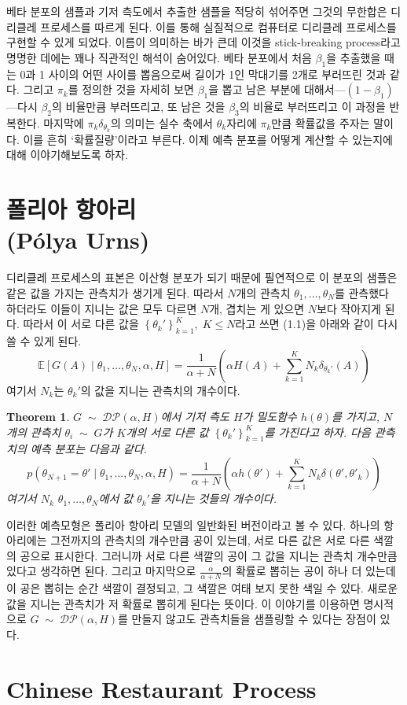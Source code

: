 \documentclass[a4paper, 10pt]{book}
\newtheorem{thm}{Theorem}[section]
\begin{document}
  베타 분포의 샘플과 기저 측도에서 추출한 샘플을 적당히 섞어주면 그것의 무한합은 디리클레 프로세스를 따르게 된다. 이를 통해 실질적으로 컴퓨터로 디리클레 프로세스를 구현할 수 있게 되었다. 이름이 의미하는 바가 큰데 이것을 stick-breaking process라고 명명한 데에는 꽤나 직관적인 해석이 숨어있다. 베타 분포에서 처음 $\beta_{1}$을 추출했을 때는 0과 1 사이의 어떤 사이를 뽑음으로써 길이가 1인 막대기를 2개로 부러뜨린 것과 같다. 그리고 $\pi_{k}$를 정의한 것을 자세히 보면 $\beta_{1}$을 뽑고 남은 부분에 대해서---$\left(1-\beta_{1}\right)$---다시 $\beta_{2}$의 비율만큼 부러뜨리고, 또 남은 것을 $\beta_{3}$의 비율로 부러뜨리고 이 과정을 반복한다. 마지막에 $\pi_{k}\delta_{\theta_{k}}$의 의미는 실수 축에서 $\theta_{k}$자리에 $\pi_{k}$만큼 확률값을 주자는 말이다. 이를 흔히 `확률질량'이라고 부른다. 이제 예측 분포를 어떻게 계산할 수 있는지에 대해 이야기해보도록 하자.
\section{폴리아 항아리\\(Pólya Urns)}
  디리클레 프로세스의 표본은 이산형 분포가 되기 때문에 필연적으로 이 분포의 샘플은 같은 값을 가지는 관측치가 생기게 된다. 따라서 $N$개의 관측치 $\theta_{1},\ldots , \theta_{N}$를 관측했다 하더라도 이들이 지니는 값은 모두 다르면 $N$개, 겹치는 게 있으면 $N$보다 작아지게 된다. 따라서 이 서로 다른 값을 $\left\{\theta_{k}'\right\}_{k=1}^{K},\; K\leq N$라고 쓰면 (1.1)을 아래와 같이 다시 쓸 수 있게 된다.
  $$
    \mathbb{E}\left[G\left(A\right)\;|\;\theta_{1},\ldots , \theta_{N},\alpha, H\right] = \frac{1}{\alpha+N}\left(\alpha H\left(A\right)+\sum_{k=1}^{K}N_{k}\delta_{\theta_{k}'}\left(A\right)\right)
  $$
  여기서 $N_{k}$는 $\theta_{k}'$의 값을 지니는 관측치의 개수이다.
  \begin{thm}
    $G\;\sim\;\mathcal{DP}\left(\alpha, H\right)$에서 기저 측도 $H$가 밀도함수 $h\left(\theta\right)$를 가지고, $N$개의 관측치 $\theta_{i}\;\sim\; G$가 $K$개의 서로 다른 값 $\left\{\theta_{k}'\right\}_{k=1}^{K}$를 가진다고 하자. 다음 관측치의 예측 분포는 다음과 같다.
    $$
      p\left(\theta_{N+1}=\theta' \;|\; \theta_{1},\ldots , \theta_{N},\alpha, H\right)=\frac{1}{\alpha+N}\left(\alpha h\left(\theta'\right)+\sum_{k=1}^{K}N_{k}\delta\left(\theta',\theta'_{k}\right)\right)
    $$
    여기서 $N_{k}$ $\theta_{1},\ldots , \theta_{N}$에서 값 $\theta_{k}'$을 지니는 것들의 개수이다.
  \end{thm}
  
  이러한 예측모형은 폴리아 항아리 모델의 일반화된 버전이라고 볼 수 있다. 하나의 항아리에는 그전까지의 관측치의 개수만큼 공이 있는데, 서로 다른 값은 서로 다른 색깔의 공으로 표시한다. 그러니까 서로 다른 색깔의 공이 그 값을 지니는 관측치 개수만큼 있다고 생각하면 된다. 그리고 마지막으로 $\frac{\alpha}{\alpha+N}$의 확률로 뽑히는 공이 하나 더 있는데 이 공은 뽑히는 순간 색깔이 결정되고, 그 색깔은 여태 보지 못한 색일 수 있다. 새로운 값을 지니는 관측치가 저 확률로 뽑히게 된다는 뜻이다. 이 이야기를 이용하면 명시적으로 $G\;\sim\;\mathcal{DP}\left(\alpha, H\right)$를 만들지 않고도 관측치들을 샘플링할 수 있다는 장점이 있다.
  \section{Chinese Restaurant Process}
\end{document}
